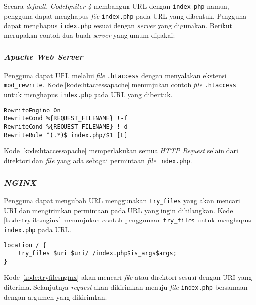 Secara \textit{default}, \textit{CodeIgniter 4} membangun URL dengan \verb|index.php| namun, pengguna dapat menghapus \textit{file} \verb|index.php| pada URL yang dibentuk. Pengguna dapat menghapus \verb|index.php| sesuai dengan \textit{server} yang digunakan. Berikut merupakan contoh dua buah \textit{server} yang umum dipakai:

\subsubsection{\textit{Apache Web Server}}
Pengguna dapat URL melalui \textit{file} \verb|.htaccess| dengan menyalakan ekstensi \verb|mod_rewrite|. Kode \ref{kode:htaccessapache} menunjukan contoh \textit{file} \verb|.htaccess| untuk menghapus \verb|index.php| pada URL yang dibentuk.

\begin{lstlisting}[caption=Contoh \textit{file} \texttt{.htaccess} pada \textit{Apache Web Server}. ,label=kode:htaccessapache]
RewriteEngine On
RewriteCond %{REQUEST_FILENAME} !-f
RewriteCond %{REQUEST_FILENAME} !-d
RewriteRule ^(.*)$ index.php/$1 [L]
\end{lstlisting}

Kode \ref{kode:htaccessapache} memperlakukan semua \textit{HTTP Request} selain dari direktori dan \textit{file} yang ada sebagai permintaan \textit{file} \texttt{index.php}.

\subsubsection{\textit{NGINX}}
Pengguna dapat mengubah URL menggunakan \verb|try_files| yang akan mencari URI dan mengirimkan permintaan pada URL yang ingin dihilangkan. Kode \ref{kode:tryfilesnginx} menunjukan contoh penggunaan \verb|try_files| untuk menghapus \verb|index.php| pada URL.

\begin{lstlisting}[caption=Contoh penggunaan \texttt{try-files}. ,label=kode:tryfilesnginx]
location / {
    try_files $uri $uri/ /index.php$is_args$args;
}
\end{lstlisting}
Kode \ref{kode:tryfilesnginx} akan mencari \textit{file} atau direktori sesuai dengan URI yang diterima. Selanjutnya \textit{request} akan dikirimkan menuju \textit{file} \texttt{index.php} bersamaan dengan argumen yang dikirimkan.

